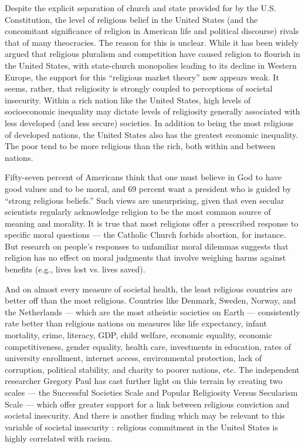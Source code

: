\documentclass[a4paper,14pt]{extarticle}
\begin{document}
Despite the explicit separation of church and state provided for by the U.S. Constitution, the level of religious belief in the United States (and the concomitant significance of religion in American life and political discourse) rivals that of many theocracies.
The reason for this is unclear.
While it has been widely argued that religious pluralism and competition have caused religion to flourish in the United States, with state-church monopolies leading to its decline in Western Europe, the support for this ``religious market theory'' now appears weak.
It seems, rather, that religiosity is strongly coupled to perceptions of societal insecurity.
Within a rich nation like the United States, high levels of socioeconomic inequality may dictate levels of religiosity generally associated with less developed (and less secure) societies.
In addition to being the most religious of developed nations, the United States also has the greatest economic inequality.
The poor tend to be more religious than the rich, both within and between nations.

Fifty-seven percent of Americans think that one must believe in God to have good values and to be moral, and 69 percent want a president who is guided by ``strong religious beliefs.''
Such views are unsurprising, given that even secular scientists regularly acknowledge religion to be the most common source of meaning and morality.
It is true that most religions offer a prescribed response to specific moral questions --- the Catholic Church forbids abortion, for instance.
But research on people’s responses to unfamiliar moral dilemmas suggests that religion has no effect on moral judgments that involve weighing harms against benefits (e.g., lives lost vs. lives saved).

And on almost every measure of societal health, the least religious countries are better off than the most religious.
Countries like Denmark, Sweden, Norway, and the Netherlands --- which are the most atheistic societies on Earth --- consistently rate better than religious nations on measures like life expectancy, infant mortality, crime, literacy, GDP, child welfare, economic equality, economic competitiveness, gender equality, health care, investments in education, rates of university enrollment, internet access, environmental protection, lack of corruption, political stability, and charity to poorer nations, etc.
The independent researcher Gregory Paul has cast further light on this terrain by creating two scales --- the Successful Societies Scale and Popular Religiosity Versus Secularism Scale --- which offer greater support for a link between religious conviction and societal insecurity.
And there is another finding which may be relevant to this variable of societal insecurity :
religious commitment in the United States is highly correlated with racism.
\end{document}
